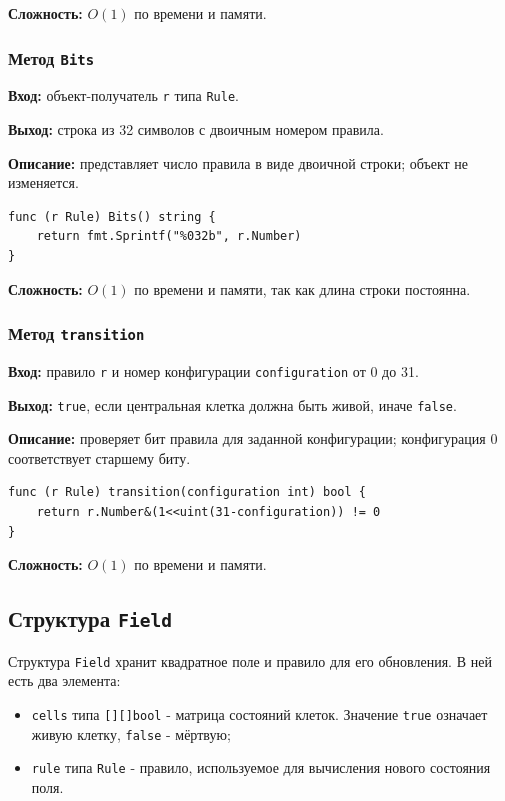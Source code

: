 \textbf{Сложность:} $O(1)$ по времени и памяти.

\subsubsection{Метод \texttt{Bits}}
\textbf{Вход:} объект-получатель \texttt{r} типа \texttt{Rule}.

\textbf{Выход:} строка из 32 символов с двоичным номером правила.

\textbf{Описание:} представляет число правила в виде двоичной строки; объект
не изменяется.

\begin{lstlisting}[style=gostyle,caption={Представление правила в двоичном виде}]
func (r Rule) Bits() string {
    return fmt.Sprintf("%032b", r.Number)
}
\end{lstlisting}

\textbf{Сложность:} $O(1)$ по времени и памяти, так как длина строки постоянна.

\subsubsection{Метод \texttt{transition}}
\textbf{Вход:} правило \texttt{r} и номер конфигурации
\texttt{configuration} от 0 до 31.

\textbf{Выход:} \texttt{true}, если центральная клетка должна быть живой,
иначе \texttt{false}.

\textbf{Описание:} проверяет бит правила для заданной конфигурации; конфигурация
0 соответствует старшему биту.

\begin{lstlisting}[style=gostyle,caption={Получение состояния клетки по правилу}]
func (r Rule) transition(configuration int) bool {
    return r.Number&(1<<uint(31-configuration)) != 0
}
\end{lstlisting}

\textbf{Сложность:} $O(1)$ по времени и памяти.

\subsection{Структура \texttt{Field}}

Структура \texttt{Field} хранит квадратное поле и правило для его обновления.
В ней есть два элемента:

\begin{itemize}
    \item \texttt{cells} типа \texttt{[][]bool} - матрица состояний клеток.
    Значение \texttt{true} означает живую клетку, \texttt{false} - мёртвую;
    \item \texttt{rule} типа \texttt{Rule} - правило, используемое для
    вычисления нового состояния поля.
\end{itemize}


